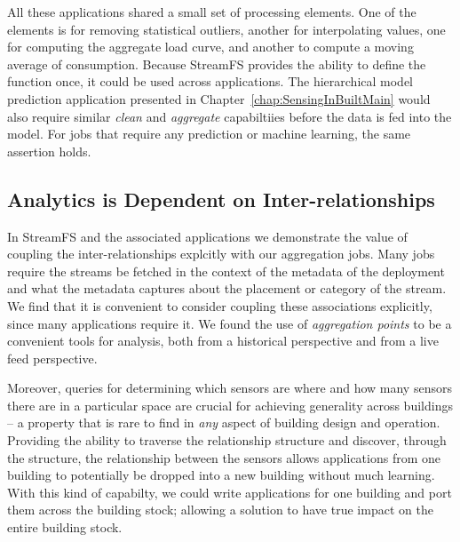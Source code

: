 All these applications shared a small set of processing elements.  One of the elements is for removing statistical outliers, 
another for interpolating values, one for computing the aggregate load curve, and another to compute a moving average of consumption.
Because StreamFS provides the ability to define the function once, it could be used across applications.
The hierarchical model prediction application presented in Chapter~\ref{chap:SensingInBuiltMain} would also require similar
\emph{clean} and \emph{aggregate} capabiltiies before the data is fed into the model.  For jobs that require any 
prediction or machine learning, the same assertion holds.

\subsection{Analytics is Dependent on Inter-relationships}
In StreamFS and the associated applications we demonstrate the value of coupling the inter-relationships explcitly with 
our aggregation jobs.  Many jobs require the streams be fetched in the context of the metadata of the deployment and what 
the metadata captures about the placement or category of the stream.  We find that it is convenient to consider
coupling these associations explicitly, since many applications require it.  We found the use of \emph{aggregation points}
to be a convenient tools for analysis, both from a historical perspective and from a live feed perspective.

Moreover, queries for determining which sensors are where and how many sensors there are in a particular space are crucial
for achieving generality across buildings -- a property that is rare to find in \emph{any} aspect of building design and operation.
Providing the ability to traverse the relationship structure and discover, through the structure, the relationship
between the sensors allows applications from one building to potentially be dropped into a new building without
much learning.  With this kind of capabilty, we could write applications for one building and port them across the building
stock; allowing a solution to have true impact on the entire building stock.



